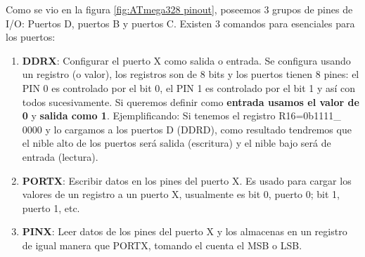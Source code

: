 \documentclass[
	12pt, %
	fleqn, %
	a4paper, %
	oneside, %
]{LegrandOrangeBook}
\begin{document}
\begin{definition}
Como se vio en la figura \ref{fig:ATmega328 pinout}, poseemos 3 grupos de pines de I/O: Puertos D, puertos B y puertos C. Existen 3 comandos para esenciales para los puertos:
\begin{enumerate}
\item \textbf{DDRX}: Configurar el puerto X como salida o entrada. Se configura usando un registro (o valor), los registros son de 8 bits y los puertos tienen 8 pines: el PIN 0 es controlado por el bit 0, el PIN 1 es controlado por el bit 1 y así con todos sucesivamente. Si queremos definir como \textbf{entrada usamos el valor de 0} y \textbf{salida como 1}. Ejemplificando: Si tenemos el registro R16=0b1111\_ 0000 y lo cargamos a los puertos D (DDRD), como resultado tendremos que el nible alto de los puertos será salida (escritura) y el nible bajo será de entrada (lectura).
\item \textbf{PORTX}: Escribir datos en los pines del puerto X. Es usado para cargar los valores de un registro a un puerto X, usualmente es bit 0, puerto 0; bit 1, puerto 1, etc.
\item \textbf{PINX}: Leer datos de los pines del puerto X y los almacenas en un registro de igual manera que PORTX, tomando el cuenta el MSB o LSB.
\end{enumerate}
\end{definition}
\end{document}
